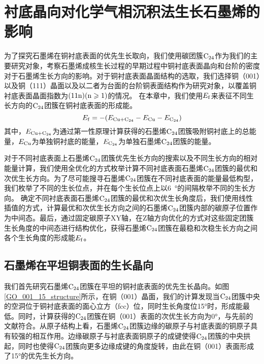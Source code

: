 \section{衬底晶向对化学气相沉积法生长石墨烯的影响}
\label{sec:石墨烯优先生长取向}
\def\CCluster#1{\rm{C_{#1}}}
    为了探究石墨烯在铜衬底表面的优先生长取向，我们使用碳团簇$\CCluster{24}$作为我们的主要研究对象，考察石墨烯成核生长过程的早期过程中铜衬底表面晶向和台阶的密度对于石墨烯生长方向的影响。对于铜衬底表面晶面结构的选取，我们选择铜（001）以及铜（111）晶面以及以二者为台面的台阶铜表面结构作为研究对象，以覆盖铜衬底表面晶面指数为$\rm{(11n)(n \geqslant 1)}$的情况。
    在本章中，我们使用$E_{\rm{f}}$来表征不同生长方向的$\CCluster{24}$团簇在铜衬底表面的形成能。
    \begin{equation}
        E_{\rm{f}}=
        -(E_{\rm{Cu+\CCluster{24}}}-E_{\rm{Cu}}-E_{\rm{\CCluster{24}}})
    \end{equation}
    其中，$E_{\rm{Cu+\CCluster{24}}}$为通过第一性原理计算获得的石墨烯$\CCluster{24}$团簇吸附铜衬底上的总能量，$E_{\rm{Cu}}$为单独铜衬底的能量，$E_{\rm{\CCluster{24}}}$为单独石墨烯$\CCluster{24}$团簇的能量。
    
    对于不同衬底表面上石墨烯$\CCluster{24}$团簇优先生长方向的搜索以及不同生长方向的相对能量计算，我们使用全优化的方式枚举计算不同衬底表面石墨烯$\CCluster{24}$团簇的最优和次优生长方向。为了尽可能搜寻石墨烯$\CCluster{24}$团簇在不同衬底表面的能量最低构型，我们枚举了不同的生长位点，并在每个生长位点上以\SI{6}{\degree}的间隔枚举不同的生长方向。 确定不同衬底表面石墨烯$\CCluster{24}$团簇的最优和次优生长角度后，我们使用线性插值的方式，计算最优和次优生长方向之间的石墨烯$\CCluster{24}$团簇内部的碳原子位置作为中间态。最后，通过固定碳原子XY轴，在Z轴方向优化的方式对这些固定团簇生长角度的中间态进行结构优化，获得石墨烯$\CCluster{24}$团簇在最稳和次稳生长方向之间各个生长角度的形成能$E_{\rm{f}}$。
    \subsection{石墨烯在平坦铜表面的生长晶向}
        我们首先研究石墨烯$\CCluster{24}$团簇在平坦的铜衬底表面的优先生长晶向。如图\ref{GO_001_15_structure}所示，在铜（001）晶面，我们的计算发现当$\CCluster{24}$团簇中央的空洞位于铜衬底表面的面心立方（fcc）位，同时生长角度位15\si{\degree}时，形成能最低。同时，计算获得的$\CCluster{24}$团簇在铜（001）表面的次优生长方向为0\si{\degree}，与先前的文献符合。从原子结构上看，石墨烯$\CCluster{24}$团簇边缘的碳原子与衬底表面的铜原子具有较强的相互作用。边缘碳原子与衬底表面铜原子的成键使得$\CCluster{24}$团簇的中央拱起，同时也使得$\CCluster{24}$团簇向更多边缘成键的角度旋转，由此在铜（001）表面形成了15\si{\degree}的优先生长方向。


